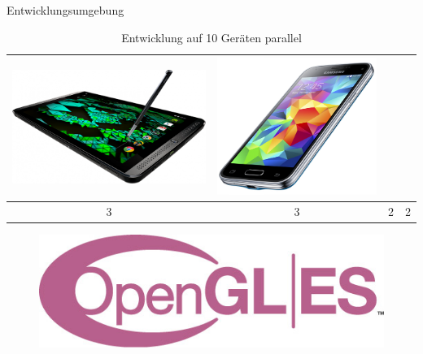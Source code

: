 \begin{frame}{Entwicklungsumgebung}
{\begin{table}[h]
\begin{tabular}{c|c|c|c}
		\includegraphics[width=\textwidth, height=0.1\textheight, keepaspectratio]{images/tablets} & 
		\includegraphics[width=\textwidth, height=0.1\textheight, keepaspectratio]{images/smartphones} \\ \hline
		3 & 3 & 2 & 2
	\end{tabular}
	\caption{Entwicklung auf 10 Geräten parallel}
	\end{table}
}
{
	\begin{figure}
		\centering
		\includegraphics[width=\textwidth, height=0.18\textheight, keepaspectratio]{images/opengl_es_logo}

\end{figure}}
\end{frame}
